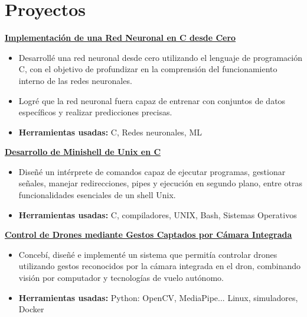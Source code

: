 \documentclass[letterpaper]{cv} %
\begin{document}
\section{Proyectos}
\textbf{\underline{Implementación de una Red Neuronal en C desde Cero}}
{\begin{itemize}
        \item Desarrollé una red neuronal desde cero utilizando el lenguaje de programación C, con el objetivo de profundizar en la comprensión del funcionamiento interno de las redes neuronales.
        \item Logré que la red neuronal fuera capaz de entrenar con conjuntos de datos específicos y realizar predicciones precisas.
        \item \textbf{Herramientas usadas:} C, Redes neuronales, ML
\end{itemize}}
\textbf{\underline{Desarrollo de Minishell de Unix en C}}
{\begin{itemize}
        \item Diseñé un intérprete de comandos capaz de ejecutar programas, gestionar señales, manejar redirecciones, pipes y ejecución en segundo plano, entre otras funcionalidades esenciales de un shell Unix.
        \item \textbf{Herramientas usadas:} C, compiladores, UNIX, Bash, Sistemas Operativos
\end{itemize}}
\textbf{\underline{Control de Drones mediante Gestos Captados por Cámara Integrada}}
{\begin{itemize}
        \item Concebí, diseñé e implementé un sistema que permitía controlar drones utilizando gestos reconocidos por la cámara integrada en el dron, combinando visión por computador y tecnologías de vuelo autónomo.
        \item \textbf{Herramientas usadas:} Python: OpenCV, MediaPipe... Linux, simuladores, Docker
\end{itemize}}
\end{document}
